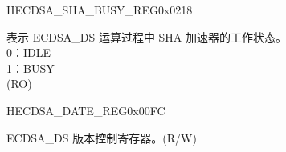 \begin{register}{H}{ECDSA\_SHA\_BUSY\_REG}{0x0218}\label{regdesc:ECDSASHABUSYREG}
%
%
\regnewline%
\begin{regdesc}\begin{reglist}
\label{fielddesc:ECDSASHABUSY}\item [ECDSA\_SHA\_BUSY] 表示 ECDSA\_DS 运算过程中 SHA 加速器的工作状态。\\
0：IDLE\\
1：BUSY\\
(RO)
\end{reglist}\end{regdesc}
\end{register}


\begin{register}{H}{ECDSA\_DATE\_REG}{0x00FC}\label{regdesc:ECDSADATEREG}
%
%
\regnewline%
\begin{regdesc}\begin{reglist}
\label{fielddesc:ECDSADATE}\item [ECDSA\_DATE] ECDSA\_DS 版本控制寄存器。(R/W)
\end{reglist}\end{regdesc}
\end{register}

